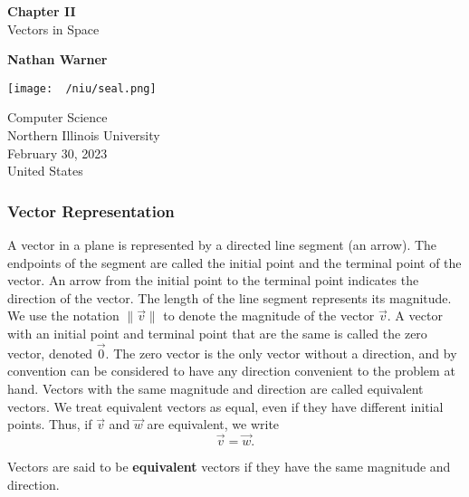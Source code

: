 \documentclass{report}
\title{\Huge{}}
\author{\huge{Nathan Warner}}
\date{\huge{}}
\begin{document}
        \begin{titlepage}
       \begin{center}
           \vspace*{1cm}
    
           \textbf{Chapter II} \\
           Vectors in Space
    
           \vspace{0.5cm}
            
                
           \vspace{1.5cm}
    
           \textbf{Nathan Warner}
    
           \vfill
                
                
           \vspace{0.8cm}
         
           \texttt{[image: ~/niu/seal.png]}
                
           Computer Science \\
           Northern Illinois University\\
           February 30, 2023 \\
           United States\\
           
                
       \end{center}
    \end{titlepage}
    \tableofcontents
    \pagebreak \bigbreak \noindent 

    \bigbreak \noindent 
    \bigbreak \noindent 
    \subsubsection{Vector Representation}
    \bigbreak \noindent 
    A vector in a plane is represented by a directed line segment (an arrow). The endpoints of the segment are called the initial point and the terminal point of the vector. An arrow from the initial point to the terminal point indicates the direction of the vector. The length of the line segment represents its magnitude. We use the notation $\lVert \vec{v} \rVert$ to denote the magnitude of the vector $\vec{v}$. A vector with an initial point and terminal point that are the same is called the zero vector, denoted $\vec{0}$. The zero vector is the only vector without a direction, and by convention can be considered to have any direction convenient to the problem at hand.
    Vectors with the same magnitude and direction are called equivalent vectors. We treat equivalent vectors as equal, even if they have different initial points. Thus, if $\vec{v}$ and $\vec{w}$ are equivalent, we write
    \[
    \vec{v} = \vec{w}.
    \]
    \bigbreak \noindent 
    \begin{dfn}
        Vectors are said to be \textbf{equivalent} vectors if they have the same magnitude and direction. 
    \end{dfn}
\end{document}
